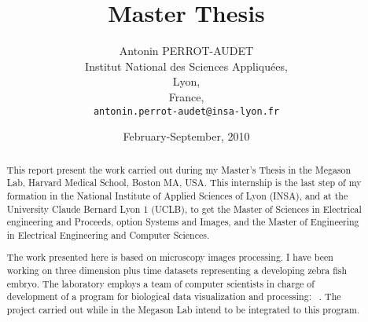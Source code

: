 








\title{Master Thesis} 
\author{Antonin PERROT-AUDET\\
  Institut National des Sciences Appliquées,\\
  Lyon,\\
  France,\\
  \texttt{antonin.perrot-audet@insa-lyon.fr}}   
\date{February-September, 2010} 
\maketitle



\begin{abstract}
  This report present the work carried out during my Master's Thesis in the Megason Lab, Harvard Medical School, Boston MA, USA.
  This internship is the last step of my formation in the National Institute of Applied Sciences of Lyon (INSA), and at the University Claude Bernard Lyon 1 (UCLB), to get the Master of Sciences in Electrical engineering and Proceeds, option Systems and Images, and the Master of Engineering in Electrical Engineering and Computer Sciences.

  The work presented here is based on microscopy images processing. I have been working on three dimension plus time datasets representing a developing zebra fish embryo. 
  The laboratory employs a team of computer scientists in charge of development of a program for biological data visualization and processing: {\gofigure}~\cite{refGofigure2}.
  The project carried out while in the Megason Lab intend to be integrated to this program.
  
\tableofcontents  
  
 
\end{abstract}













